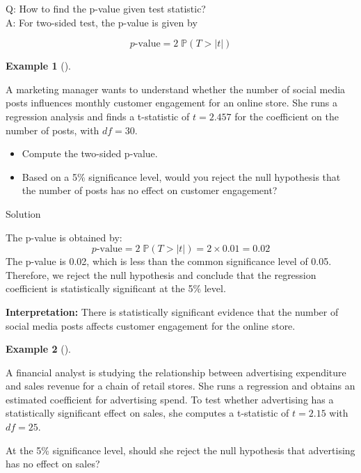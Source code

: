 \documentclass[
  12pt,
  letterpaper,
]{scrbook}
\providecommand{\tightlist}{%
  \setlength{\itemsep}{0pt}\setlength{\parskip}{0pt}}
\renewcommand{\tightlist}{\setlength{\itemsep}{0.5\baselineskip}\setlength{\parskip}{0.2\baselineskip}}
\renewcommand{\P}{\mathbb{P}}
\theoremstyle{definition}
\newtheorem{example}{Example}[chapter]
\theoremstyle{plain}
\theoremstyle{remark}
\begin{document}
Q: How to find the p-value given test statistic?\\
A: For two-sided test, the p-value is given by

\[
p\text{-value} = 2\;\P(T > |t|)
\]

\begin{example}[]\protect\hypertarget{exm-1}{}\label{exm-1}

A marketing manager wants to understand whether the number of social
media posts influences monthly customer engagement for an online store.
She runs a regression analysis and finds a t-statistic of \(t = 2.457\)
for the coefficient on the number of posts, with \(df = 30\).

\begin{itemize}
\tightlist
\item
  Compute the two-sided p-value.
\item
  Based on a 5\% significance level, would you reject the null
  hypothesis that the number of posts has no effect on customer
  engagement?
\end{itemize}

\end{example}

Solution

\label{solution1}
The p-value is obtained by:
\[p\text{-value} = 2\;\P(T > |t|) = 2 \times 0.01 = 0.02\] The p-value
is 0.02, which is less than the common significance level of 0.05.
Therefore, we reject the null hypothesis and conclude that the
regression coefficient is statistically significant at the 5\% level.

\textbf{Interpretation:} There is statistically significant evidence
that the number of social media posts affects customer engagement for
the online store.

\begin{example}[]\protect\hypertarget{exm-2}{}\label{exm-2}

A financial analyst is studying the relationship between advertising
expenditure and sales revenue for a chain of retail stores. She runs a
regression and obtains an estimated coefficient for advertising spend.
To test whether advertising has a statistically significant effect on
sales, she computes a t-statistic of \(t = 2.15\) with \(df = 25\).

At the 5\% significance level, should she reject the null hypothesis
that advertising has no effect on sales?

\end{example}
\end{document}
